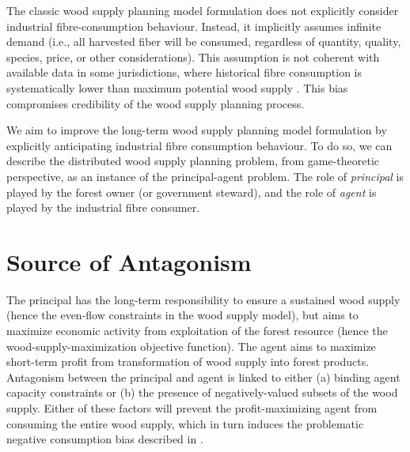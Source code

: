 
The classic wood supply planning model formulation 
does not explicitly consider industrial fibre-consumption behaviour. Instead, it implicitly assumes infinite demand (i.e., all harvested fiber will be consumed, regardless of quantity, quality, species, price, or other considerations). This assumption is not coherent with available data in some jurisdictions, where historical fibre consumption is systematically lower than maximum potential wood supply \citep{ccfm2005wood}.  This bias compromises credibility of the wood supply planning process.

We aim to improve the long-term wood supply planning model formulation by explicitly anticipating industrial fibre consumption behaviour. To do so, we can describe the distributed wood supply planning problem, from game-theoretic perspective, as an instance of the principal-agent problem. 
The role of \emph{principal} is played by the forest owner (or government steward), and the role of \emph{agent} is played by the industrial fibre consumer. 


\section{Source of Antagonism}

The principal has the long-term responsibility to ensure a sustained wood supply (hence the even-flow constraints in the wood supply model), but aims to maximize economic activity from exploitation of the forest resource (hence the wood-supply-maximization objective function).
The agent aims to maximize short-term profit from transformation of wood supply into forest products.
Antagonism between the principal and agent is linked to either (a) binding agent capacity constraints or (b) the presence of negatively-valued subsets of the wood supply. 
Either of these factors will prevent the profit-maximizing agent from consuming the entire wood supply, which in turn induces the problematic negative consumption bias described in \citet{paradis2013risk}.

